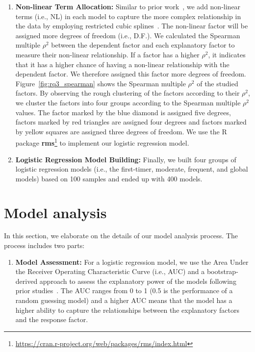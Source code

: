 \documentclass[10pt,journal,compsoc]{IEEEtran}
\begin{document}
\begin{appendices}
\begin{enumerate}
    \item \textbf{Non-linear Term Allocation:}
      Similar to prior work~\cite{mcintosh2016empirical, wang2017understanding}, we add non-linear terms (i.e., NL) in each model to capture the more complex relationship in the data by employing restricted cubic splines~\cite{Harrell:2006}. The non-linear factor will be assigned more degrees of freedom (i.e., D.F.). We calculated the Spearman multiple $\rho^2$ between the dependent factor and each explanatory factor to measure their non-linear relationship. If a factor has a higher $\rho^2$, it indicates that it has a higher chance of having a non-linear relationship with the dependent factor. We therefore assigned this factor more degrees of freedom.
      Figure~\ref{fig:rq3_spearman} shows the Spearman multiple $\rho^2$ of the studied factors. By observing the rough clustering of the
      factors according to their $\rho^2$, we cluster the factors into four groups according to the Spearman multiple $\rho^2$  values. The factor marked by the blue diamond is assigned five degrees, factors marked by red triangles are assigned four degrees and factors marked by yellow squares are assigned three degrees of freedom.
      We use the R package \textbf{rms}\footnote{\url{https://cran.r-project.org/web/packages/rms/index.html}} to implement our logistic regression model.

      \item \textbf{Logistic Regression Model Building:} Finally, we built four groups of logistic regression models (i.e., the first-timer, moderate, frequent, and global models) based on 100 samples and ended up with 400 models.


	\end{enumerate}
	
	
	

      \section{Model analysis}
      In this section, we elaborate on the details of our model analysis process. The process includes two parts:
      \begin{enumerate}
      	\item \textbf{Model Assessment:}  For a logistic regression model, we use the Area Under the Receiver Operating Characteristic Curve (i.e., AUC) and a bootstrap-derived approach \cite{efron1986biased} to assess the explanatory power of the models following prior studies~\cite{mcintosh2016empirical,wang2017understanding,kabinna2018examining}. The AUC ranges from 0 to 1 (0.5 is the performance of a random guessing model) and a higher AUC means that the model has a higher ability to capture the relationships between the explanatory factors and the response factor.


\end{enumerate}
\end{appendices}
\end{document}
